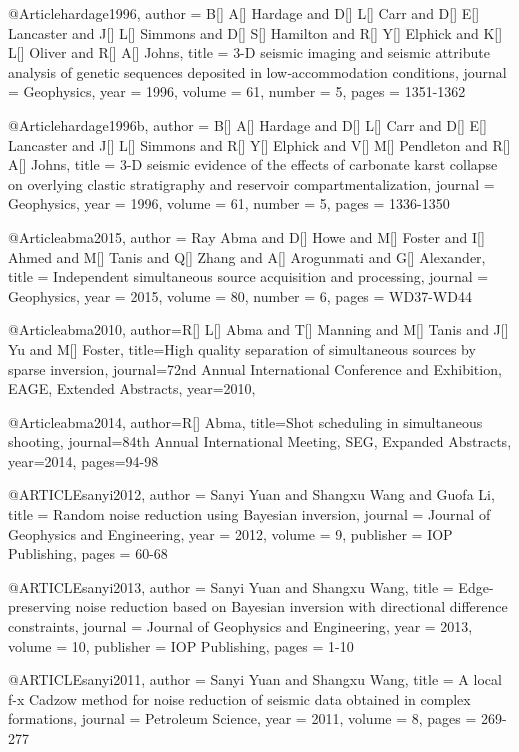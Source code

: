 {  
  
@Article{hardage1996,
  author = 	 {B[] A[] Hardage and D[] L[] Carr and D[] E[] Lancaster and J[] L[] Simmons and D[] S[] Hamilton and R[] Y[] Elphick and K[] L[] Oliver and R[] A[] Johns},
  title = 	 {3-D seismic imaging and seismic attribute analysis of genetic sequences deposited in low‐accommodation conditions},
  journal = 	 {Geophysics},
  year = 	 1996,
  volume = 	 61,
  number = 	 5,
  pages = 	 {1351-1362}}

@Article{hardage1996b,
  author = 	 {B[] A[] Hardage and D[] L[] Carr and D[] E[] Lancaster and J[] L[] Simmons and R[] Y[] Elphick and V[] M[] Pendleton and R[] A[] Johns},
  title = 	 {3-D seismic evidence of the effects of carbonate karst collapse on overlying clastic stratigraphy and reservoir compartmentalization},
  journal = 	 {Geophysics},
  year = 	 1996,
  volume = 	 61,
  number = 	 5,
  pages = 	 {1336-1350}}
 
@Article{abma2015,
  author = 	 {Ray Abma and D[] Howe and M[] Foster and I[] Ahmed and M[] Tanis and Q[] Zhang and A[] Arogunmati and G[] Alexander},
  title = 	 {Independent simultaneous source acquisition and processing},
  journal = 	 {Geophysics},
  year = 	 2015,
  volume = 	 80,
  number = 	 6,
  pages = 	 {WD37-WD44}}
  
    
@Article{abma2010,
  author={R[] L[] Abma and T[] Manning and M[] Tanis and J[] Yu and M[] Foster},
  title={High quality separation of simultaneous sources by sparse inversion},
  journal={72nd Annual International Conference and Exhibition, EAGE, Extended Abstracts},
  year=2010,
}

@Article{abma2014,
  author={R[] Abma},
  title={Shot scheduling in simultaneous shooting},
  journal={84th Annual International Meeting, SEG, Expanded Abstracts},
  year=2014,
  pages={94-98}
}

@ARTICLE{sanyi2012,
  author = {Sanyi Yuan and Shangxu Wang and Guofa Li},
  title = {Random noise reduction using Bayesian inversion},
  journal = {Journal of Geophysics and Engineering},
  year = {2012},
  volume = {9},
  publisher = {IOP Publishing},
  pages = {60-68}
}

@ARTICLE{sanyi2013,
  author = {Sanyi Yuan and Shangxu Wang},
  title = {Edge-preserving noise reduction based on Bayesian inversion with directional difference constraints},
  journal = {Journal of Geophysics and Engineering},
  year = {2013},
  volume = {10},
  publisher = {IOP Publishing},
  pages = {1-10}
}

@ARTICLE{sanyi2011,
  author = {Sanyi Yuan and Shangxu Wang},
  title = {A local f-x Cadzow method for noise reduction of seismic data obtained in complex formations},
  journal = {Petroleum Science},
  year = {2011},
  volume = {8},
  pages = {269-277}
}

}
